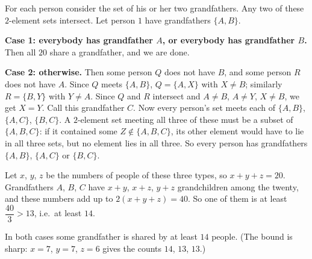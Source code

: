 For each person consider the set of his or her two grandfathers. Any two of these $2$-element sets intersect. Let person $1$ have grandfathers $\{A,B\}$.

\textbf{Case 1: everybody has grandfather $A$, or everybody has grandfather $B$.} Then all $20$ share a grandfather, and we are done.

\textbf{Case 2: otherwise.} Then some person $Q$ does not have $B$, and some person $R$ does not have $A$. Since $Q$ meets $\{A,B\}$, $Q=\{A,X\}$ with $X\ne B$; similarly $R=\{B,Y\}$ with $Y\ne A$. Since $Q$ and $R$ intersect and $A\ne B$, $A\ne Y$, $X\ne B$, we get $X=Y$. Call this grandfather $C$. Now every person's set meets each of $\{A,B\}$, $\{A,C\}$, $\{B,C\}$. A $2$-element set meeting all three of these must be a subset of $\{A,B,C\}$: if it contained some $Z\notin\{A,B,C\}$, its other element would have to lie in all three sets, but no element lies in all three. So every person has grandfathers $\{A,B\}$, $\{A,C\}$ or $\{B,C\}$.

Let $x$, $y$, $z$ be the numbers of people of these three types, so $x+y+z=20$. Grandfathers $A$, $B$, $C$ have $x+y$, $x+z$, $y+z$ grandchildren among the twenty, and these numbers add up to $2(x+y+z)=40$. So one of them is at least $\dfrac{40}{3}>13$, i.e.\ at least $14$.

In both cases some grandfather is shared by at least $14$ people. (The bound is sharp: $x=7$, $y=7$, $z=6$ gives the counts $14$, $13$, $13$.)
